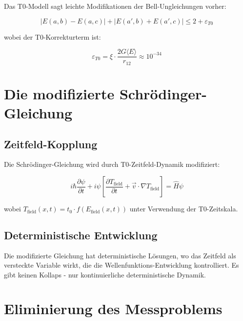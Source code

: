 \documentclass[12pt,a4paper]{report}
\begin{document}
Das T0-Modell sagt leichte Modifikationen der Bell-Ungleichungen vorher:

\begin{equation}
	|E(a,b) - E(a,c)| + |E(a',b) + E(a',c)| \leq 2 + \varepsilon_{T0}
\end{equation}

wobei der T0-Korrekturterm ist:

\begin{equation}
	\varepsilon_{T0} = \xi \cdot \frac{2G\langle E \rangle}{r_{12}} \approx 10^{-34}
\end{equation}

\section{Die modifizierte Schrödinger-Gleichung}
\label{sec:modified_schrodinger}

\subsection{Zeitfeld-Kopplung}
\label{subsec:time_field_coupling}

Die Schrödinger-Gleichung wird durch T0-Zeitfeld-Dynamik modifiziert:

\begin{equation}
	\boxed{i \hbar \frac{\partial\psi}{\partial t} + i\psi\left[\frac{\partial T_{\text{field}}}{\partial t} + \vec{v} \cdot \nabla T_{\text{field}}\right] = \hat{H}\psi}
	\label{eq:modified_schrodinger}
\end{equation}

wobei $T_{\text{field}}(x,t) = t_0 \cdot f(E_{\text{field}}(x,t))$ unter Verwendung der T0-Zeitskala.

\subsection{Deterministische Entwicklung}
\label{subsec:deterministic_evolution}

Die modifizierte Gleichung hat deterministische Lösungen, wo das Zeitfeld als versteckte Variable wirkt, die die Wellenfunktions-Entwicklung kontrolliert. Es gibt keinen Kollaps - nur kontinuierliche deterministische Dynamik.

\section{Eliminierung des Messproblems}
\label{sec:measurement_problem}
\end{document}
